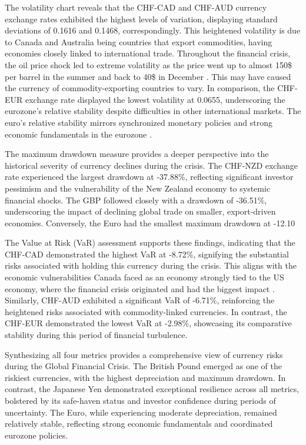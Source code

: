 \documentclass[11pt,a4paper,english,oneside]{book}
\begin{document}
The volatility chart reveals that the CHF-CAD and CHF-AUD currency exchange rates exhibited the highest levels of variation, displaying standard deviations of 0.1616 and 0.1468, correspondingly. This heightened volatility is due to Canada and Australia being countries that export commodities, having economies closely linked to international trade. Throughout the financial crisis, the oil price shock led to extreme volatility as the price went up to almost 150\$ per barrel in the summer and back to 40\$ in December \parencite{behr20092008}. This may have caused the currency of commodity-exporting countries to vary. In comparison, the CHF-EUR exchange rate displayed the lowest volatility at 0.0655, underscoring the eurozone's relative stability despite difficulties in other international markets. The euro's relative stability mirrors synchronized monetary policies and strong economic fundamentals in the eurozone \parencite{lane2012european}.

The maximum drawdown measure provides a deeper perspective into the historical severity of currency declines during the crisis. The CHF-NZD exchange rate experienced the largest drawdown at -37.88\%, reflecting significant investor pessimism and the vulnerability of the New Zealand economy to systemic financial shocks. The GBP followed closely with a drawdown of -36.51\%, underscoring the impact of declining global trade on smaller, export-driven economies. Conversely, the Euro had the smallest maximum drawdown at -12.10%

The Value at Risk (VaR) assessment supports these findings, indicating that the CHF-CAD demonstrated the highest VaR at -8.72\%, signifying the substantial risks associated with holding this currency during the crisis. This aligns with the economic vulnerabilities Canada faced as an economy strongly tied to the US economy, where the financial crisis originated and had the biggest impact \parencite{claessens2010cross}. Similarly, CHF-AUD exhibited a significant VaR of -6.71\%, reinforcing the heightened risks associated with commodity-linked currencies. In contrast, the CHF-EUR demonstrated the lowest VaR at -2.98\%, showcasing its comparative stability during this period of financial turbulence.

Synthesizing all four metrics provides a comprehensive view of currency risks during the Global Financial Crisis. The British Pound emerged as one of the riskiest currencies, with the highest depreciation and maximum drawdown. In contrast, the Japanese Yen demonstrated exceptional resilience across all metrics, bolstered by its safe-haven status and investor confidence during periods of uncertainty. The Euro, while experiencing moderate depreciation, remained relatively stable, reflecting strong economic fundamentals and coordinated eurozone policies.
\end{document}
